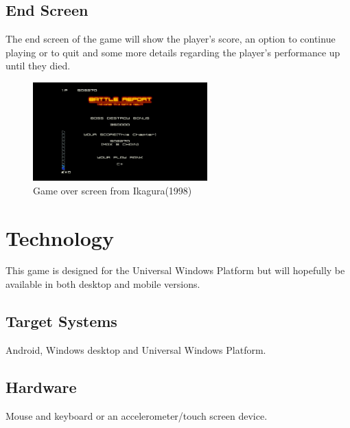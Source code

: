 \documentclass[a4paper]{scrreprt}
\begin{document}
\clearpage
\section{End Screen}
The end screen of the game will show the player's score, an option to continue playing or to quit and some more details regarding the player's performance up until they died.
\begin{figure}[h]
  \centering
  \includegraphics[width=0.6\textwidth]{GameOver}
  \caption{Game over screen from Ikagura(1998)}
  \end{figure}


\chapter{Technology}
This game is designed for the Universal Windows Platform but will hopefully be available in both desktop and mobile versions.

\section{Target Systems}
Android, Windows desktop and Universal Windows Platform.

\section{Hardware}
Mouse and keyboard or an accelerometer/touch screen device.
\end{document}
